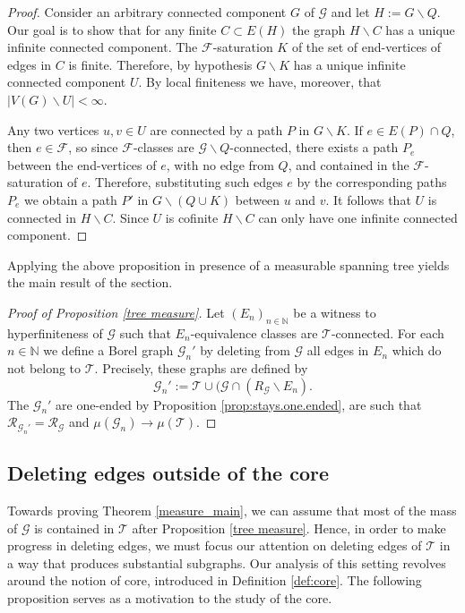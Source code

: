 \documentclass[letterpaper,11pt,reqno]{amsart}
\theoremstyle{bfnote}
\theoremstyle{definition}
\newcommand{\0}{\varnothing}
\numberwithin{equation}{section}
\begin{document}
\begin{proof}
Consider an arbitrary  connected component $G$ of $\mathcal{G}$ and let $H := G \backslash Q$. Our goal is to show that for any finite $C \subset E(H)$ the graph $H \backslash C$ has a unique infinite connected component. The $\mathcal{F}$-saturation $K$ of the set of end-vertices of edges in $C$ is finite. Therefore, by hypothesis $G \backslash K$ has a unique infinite connected component $U$. By local finiteness we have, moreover, that $|V(G) \backslash U| < \infty$.


Any two vertices $u,v \in U$ are connected by a path $P$ in $G\backslash K$. If $e \in E(P) \cap Q$, then $e \in \mathcal{F}$, so since $\mathcal{F}$-classes are $\mathcal{G}\backslash Q$-connected, there exists a path $P_e$ between the end-vertices of $e$, with no edge from $Q$, and contained in the $\mathcal{F}$-saturation of $e$. Therefore, substituting such edges $e$ by the corresponding paths $P_e$ we obtain a path $P'$ in $G \backslash (Q \cup K)$ between $u$ and $v$. It follows that $U$ is connected in $H \backslash C$. Since $U$ is cofinite $H\backslash C$ can only have one infinite connected component.
\end{proof}

Applying the above proposition in presence of a measurable spanning tree yields the main result of the section.

\begin{proof}[Proof of Proposition \ref{tree measure}]
    Let $(E_n)_{n\in \mathbb N}$ be a witness to hyperfiniteness of $\mathcal G$ such that $E_n$-equivalence classes are $\mathcal T$-connected. For each $n \in \mathbb N$ we define a Borel graph $\mathcal G_n'$ by deleting from $\mathcal G$ all edges in $E_n$ which do not belong to $\mathcal T$. Precisely, these graphs are defined by $$
    \mathcal G_n' := \mathcal T \cup (\mathcal G \cap (R_{\mathcal G} \backslash E_n).
    $$
    The $\mathcal G_n'$ are one-ended by Proposition \ref{prop:stays.one.ended}, are such that $\mathcal R_{\mathcal G_n'} = \mathcal R_{\mathcal G}$ and $\mu (\mathcal G_n) \to \mu (\mathcal T)$.
\end{proof}

\subsection{Deleting edges outside of the core}\label{finite}

Towards proving Theorem \ref{measure_main}, we can assume that most of the mass of $\mathcal G$ is contained in $\mathcal T$ after Proposition \ref{tree measure}. Hence, in order to make progress in deleting edges, we must focus our attention on deleting edges of $\mathcal T$ in a way that produces substantial subgraphs. Our analysis of this setting revolves around the notion of core, introduced in Definition \ref{def:core}. The following proposition serves as a motivation to the study of the core.
\end{document}
